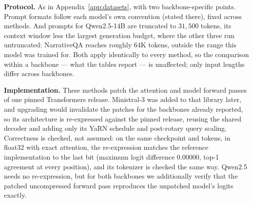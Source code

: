 \documentclass{article} %
\begin{document}
\textbf{Protocol.} As in Appendix~\ref{app:datasets}, with two backbone-specific
points. Prompt formats follow each model's own convention (stated there), fixed
across methods. And prompts for Qwen2.5-14B are truncated to $31{,}500$ tokens,
its context window less the largest generation budget, where the other three run
untruncated: NarrativeQA reaches roughly $64$K tokens, outside the range this
model was trained for. Both apply identically to every method, so the comparison
within a backbone --- what the tables report --- is unaffected; only input
lengths differ across backbones.

\textbf{Implementation.} These methods patch the attention and model forward
passes of one pinned Transformers release. Ministral-3 was added to that library
later, and upgrading would invalidate the patches for the backbones already
reported, so its architecture is re-expressed against the pinned release, reusing
the shared decoder and adding only its YaRN schedule and post-rotary query
scaling. Correctness is checked, not assumed: on the same checkpoint and tokens,
in float32 with exact attention, the re-expression matches the reference
implementation to the last bit (maximum logit difference $0.00000$, top-1
agreement at every position), and its tokenizer is checked the same way. Qwen2.5
needs no re-expression, but for both backbones we additionally verify that the
patched uncompressed forward pass reproduces the unpatched model's logits
exactly.

\color{black}
\end{document}
